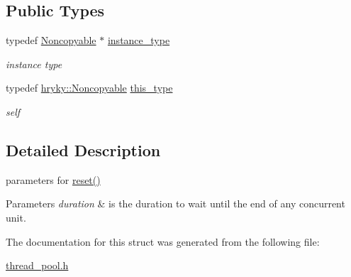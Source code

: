 \subsection*{Public Types}
\begin{DoxyCompactItemize}
\item 
\hypertarget{classhryky_1_1_noncopyable_aaf87abb55f700af85ecb0895f6178821}{typedef \hyperlink{classhryky_1_1_noncopyable}{Noncopyable} $\ast$ \hyperlink{classhryky_1_1_noncopyable_aaf87abb55f700af85ecb0895f6178821}{instance\-\_\-type}}\label{classhryky_1_1_noncopyable_aaf87abb55f700af85ecb0895f6178821}

\begin{DoxyCompactList}\small\item\em instance type \end{DoxyCompactList}\item 
\hypertarget{classhryky_1_1_noncopyable_acf13ad1c98a76247a561dff514979da5}{typedef \hyperlink{classhryky_1_1_noncopyable}{hryky\-::\-Noncopyable} \hyperlink{classhryky_1_1_noncopyable_acf13ad1c98a76247a561dff514979da5}{this\-\_\-type}}\label{classhryky_1_1_noncopyable_acf13ad1c98a76247a561dff514979da5}

\begin{DoxyCompactList}\small\item\em self \end{DoxyCompactList}\end{DoxyCompactItemize}


\subsection{Detailed Description}
parameters for \hyperlink{classhryky_1_1thread_1_1_pool_a7060b7e3c556334ec71aa2b42401231f}{reset()} 


\begin{DoxyParams}{Parameters}
{\em duration} & is the duration to wait until the end of any concurrent unit. \\
\hline
\end{DoxyParams}


The documentation for this struct was generated from the following file\-:\begin{DoxyCompactItemize}
\item 
\hyperlink{thread__pool_8h}{thread\-\_\-pool.\-h}\end{DoxyCompactItemize}
